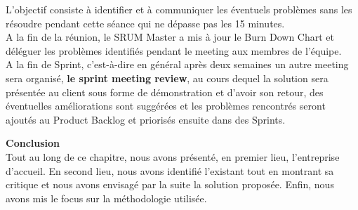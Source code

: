 \begin{enumerate}
\begin{itemize}
		L'objectif consiste à identifier et à communiquer les éventuels problèmes sans les résoudre pendant cette séance qui ne dépasse pas les 15 minutes.\\
		A la fin de la réunion, le SRUM Master a mis à jour le Burn Down Chart et déléguer les problèmes identifiés pendant le meeting aux membres de l'équipe.\\
		A la fin de Sprint, c'est-à-dire en général après deux semaines un autre meeting sera organisé, \textbf{le sprint meeting review}, au cours dequel la solution sera présentée au client sous forme de démonstration et d'avoir son retour, des éventuelles améliorations sont suggérées et les problèmes rencontrés seront ajoutés au Product Backlog et priorisés ensuite dans des Sprints. 
		
		
	\end{itemize}
	
\end{enumerate}


\textbf{Conclusion}\\
Tout au long de ce chapitre, nous avons présenté, en premier lieu, l'entreprise d'accueil. En second lieu, nous avons identifié l'existant tout en montrant sa critique et nous avons envisagé par la suite la solution proposée. Enfin, nous avons mis le focus sur la méthodologie utilisée.  